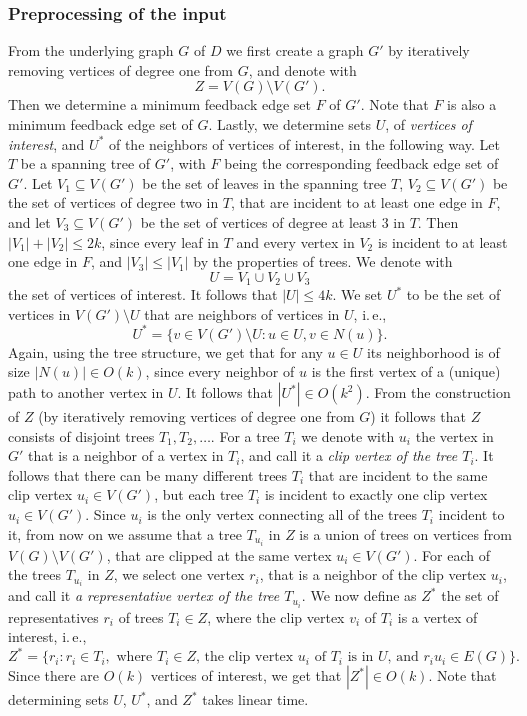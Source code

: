 \documentclass[a4paper,UKenglish,cleveref, autoref, thm-restate, anonymous]{lipics-v2021}
\newcommand{\ie}{i.\,e.,\ }
\begin{document}
\subsubsection{Preprocessing of the input}
From the underlying graph $G$ of $D$ we first create a graph $G'$ by
iteratively removing vertices of degree one from $G$,
and denote with 
\[
Z = V(G) \setminus V(G').
\]
Then we determine a minimum feedback edge set $F$ of $G'$.
Note that $F$ is also a minimum feedback edge set of $G$.
Lastly, we determine sets $U$, of \emph{vertices of interest}, and $U^*$ of the neighbors of vertices of interest, in the following way.
Let $T$ be a spanning tree of $G'$, with $F$ being the corresponding feedback edge set of $G'$.
Let $V_1 \subseteq V(G')$ be the set of leaves in the spanning tree $T$, $V_2 \subseteq V(G')$ be the set of vertices of degree two in $T$, that are incident to at least one edge in $F$, 
and let $V_3 \subseteq V(G')$ be the set of vertices of degree at least $3$ in $T$. 
Then $|V_1| + |V_2| \leq 2k$, since every leaf in $T$ and every vertex in $V_2$ is incident to at least one edge in $F$,
and $|V_3| \leq |V_1|$ by the properties of trees.
We denote with 
\[U = V_1 \cup V_2 \cup V_3\]
the set of vertices of interest. It follows that $|U| \leq 4k$.
We set $U^*$ to be the set of vertices in $V(G') \setminus U$ that are neighbors of vertices in $U$, \ie 
\[U^* = \{v \in V(G') \setminus U  :  u \in U, v \in N(u)\}.\]
Again, using the tree structure, we get that for any $u \in U$ its neighborhood is of size $|N(u)| \in O(k)$, since every neighbor of $u$ is the first vertex of a (unique) path to another vertex in $U$.
It follows that $|U^*| \in O(k^2)$.
From the construction of $Z$ (by iteratively removing vertices of degree one from $G$)
it follows that $Z$ consists of disjoint trees $T_1, T_2, \dots$.
For a tree $T_i$ we denote with $u_i$ the vertex in $G'$ that is a neighbor of a vertex in $T_i$, 
and call it a \emph{clip vertex of the tree $T_i$}.
It follows that there can be many different trees $T_i$ that are incident to the same clip vertex $u_i \in V(G')$,
but each tree $T_i$ is incident to exactly one clip vertex $u_i \in V(G')$.
Since $u_i$ is the only vertex connecting all of the trees $T_i$ incident to it,
from now on we assume that a tree $T_{u_i}$ in $Z$ is a union of trees on vertices from $V(G) \setminus V(G')$,
that are clipped at the same vertex $u_i \in V(G')$.
For each of the trees $T_{u_i}$ in $Z$, we select one vertex $r_i$, that is a neighbor of the clip vertex $u_i$,
and call it \emph{a representative vertex of the tree $T_{u_i}$}.
We now define as $Z^*$ the set of representatives $r_i$ of trees $T_i \in Z$,
where the clip vertex $v_i$ of $T_i$ is a vertex of interest, \ie
\[
Z^* = \{ r_i  :  r_i \in T_i, \text{ where $T_i \in Z$, the clip vertex $u_i$ of $T_i$ is in $U$, and $r_i u_i \in E(G)$}\}.
\]
Since there are $O(k)$ vertices of interest, we get that $|Z^*| \in O(k)$.
Note that determining sets $U$, $U^*$, and $Z^*$ takes linear time.
\end{document}
